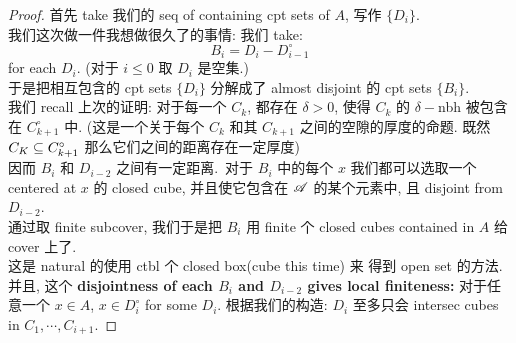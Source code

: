 \begin{proof}
    首先 take 我们的 seq of containing cpt sets of $A$, 写作 $\{D_i\}$.\\
    我们这次做一件我想做很久了的事情: 我们 take:
    $$
    B_i = D_i - D_{i-1}^{\circ}
    $$ for each $D_i$. (对于 $i\leq 0$ 取 $D_i$ 是空集.)\\
    于是把相互包含的 cpt sets $\{D_i\}$ 分解成了 almost disjoint 的 cpt sets $\{B_i\}$. \\
    我们 recall 上次的证明: 对于每一个 $C_k$, 都存在 $\delta > 0$, 使得 $C_k$ 的 $\delta-$nbh 被包含在 $C_{k+1} ^ {\circ}$ 中. (这是一个关于每个 $C_k$ 和其 $C_{k+1}$ 之间的空隙的厚度的命题. 既然 $C_K \subseteq C_{k+1} ^ {\circ}$ 那么它们之间的距离存在一定厚度)\\
    因而 $B_i$ 和 $D_{i-2}$ 之间有一定距离.\
    对于 $B_i$ 中的每个 $x$ 我们都可以选取一个 centered at $x$ 的 closed cube, 并且使它包含在 $\mathscr{A}$ 的某个元素中, 且 disjoint from $D_{i-2}$.\\
    通过取 finite subcover, 我们于是把 $B_i$ 用 finite 个 closed cubes contained in $A$ 给 cover 上了.\\
    这是 natural 的使用 ctbl 个 closed box(cube this time) 来 得到 open set 的方法.\\
    并且, 这个 \textbf{disjointness of each $B_i$ and $D_{i-2}$ gives local finiteness:} 对于任意一个 $x\in A$, $x \in D_i ^{\circ}$ for some $D_i$. 根据我们的构造: $D_i$ 至多只会 intersec cubes in $C_1, \cdots, C_{i+1}$. 
\end{proof}















